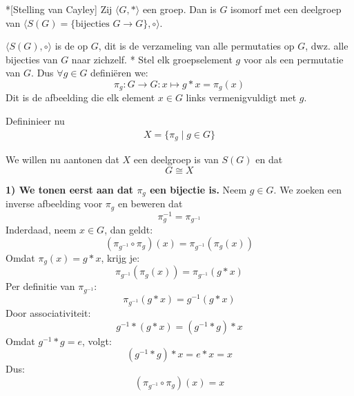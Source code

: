 \begin{nicetheorem}*[Stelling van Cayley]
    Zij $\langle G,* \rangle$ een groep. Dan is $G$ isomorf met een deelgroep van $\langle S(G) = \{\text{bijecties } G \to G\},\circ \rangle$. 
    
    \vspace{0.25cm}
    
    $\langle S(G),\circ \rangle$ is de  op $G$, dit is de verzameling van alle permutaties op $G$, dwz. alle bijecties van $G$ naar zichzelf.
    \nextpart[Bewijs.]*
    Stel elk groepselement $g$ voor als een permutatie van $G$. Dus $\forall g \in G$ definiëren we:
    \begin{equation*}
        \pi_g : G \to G : x \mapsto g*x = \pi_g(x)
    \end{equation*}
    Dit is de afbeelding die elk element $x \in G$ links vermenigvuldigt met $g$.

    Defininieer nu
    \begin{eqnarray}
        X = \{\pi_g \mid g \in G\}
    \end{eqnarray}

    We willen nu aantonen dat $X$ een deelgroep is van $S(G)$ en dat
    \begin{equation*}
        G \cong X
    \end{equation*}

    \vspace{0.25cm}

    \textbf{1) We tonen eerst aan dat $\pi_g$ een bijectie is.} Neem $g \in G$. We zoeken een inverse afbeelding voor $\pi_g$ en beweren dat
    \begin{equation*}
        \pi_g^{-1} = \pi_{g^{-1}}
    \end{equation*} 
    Inderdaad, neem $x \in G$, dan geldt:
    \begin{equation*}
        (\pi_{g^{-1}} \circ \pi_g)(x) = \pi_{g^{-1}}(\pi_g(x))
    \end{equation*}
    Omdat $\pi_g(x) = g*x$, krijg je:
    \begin{equation*}
        \pi_{g^{-1}}(\pi_g(x)) = \pi_{g^{-1}}(g*x)
    \end{equation*}
    Per definitie van $\pi_{g^{-1}}$:
    \begin{equation*}
        \pi_{g^{-1}}(g*x) = g^{-1}(g*x)
    \end{equation*}
    Door associativiteit:
    \begin{equation*}
        g^{-1}*(g*x) = (g^{-1}*g)*x
    \end{equation*}
    Omdat $g^{-1}*g = e$, volgt:
    \begin{equation*}
        (g^{-1}*g)*x = e*x = x
    \end{equation*}
    Dus:
    \begin{equation*}
        (\pi_{g^{-1}} \circ \pi_g)(x) = x
    \end{equation*}


\end{nicetheorem}
